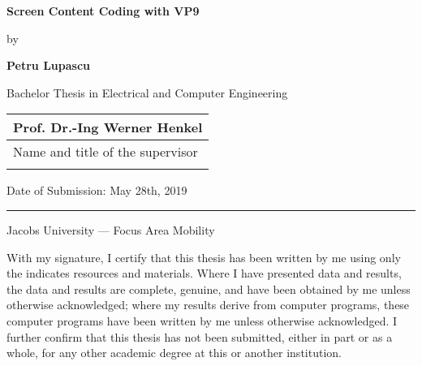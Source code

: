 \documentclass[a4paper,11pt,oneside]{article}
\newcommand{\myname}{Petru Lupascu}
\newcommand{\mytitle}{Screen Content Coding with VP9}
\newcommand{\mysupervisor}{Prof. Dr.-Ing Werner Henkel}
\begin{document}

  \thispagestyle{empty}

  \begin{flushright}
  \end{flushright}
  \vspace{20mm}
  \begin{center}
    \huge
    \textbf{\mytitle}
  \end{center}
  \vspace*{4mm}
  \begin{center}
   \Large by
  \end{center}
  \vspace*{4mm}
  \begin{center}
    \Large
    \textbf{\myname}
  \end{center}
  \vspace*{20mm}
  \begin{center}
    \large
    Bachelor Thesis in Electrical and Computer Engineering
  \end{center}
  \vfill
  \begin{flushright}
    \large
    \begin{tabular}{l}
      \mysupervisor \\
      \hline
      Name and title of the supervisor \\
      \\
    \end{tabular}
  \end{flushright}
  \vspace*{8mm}
  \begin{flushleft}
    \large
    Date of Submission: May 28th, 2019 \\
    \rule{\textwidth}{1pt}
  \end{flushleft}
  \begin{center}
    \Large Jacobs University --- Focus Area Mobility
  \end{center}
  
  \iffalse

  \newpage
  \thispagestyle{empty}

  With my signature, I certify that this thesis has been written by me
  using only the indicates resources and materials. Where I have
  presented data and results, the data and results are complete,
  genuine, and have been obtained by me unless otherwise acknowledged;
  where my results derive from computer programs, these computer
  programs have been written by me unless otherwise acknowledged. I
  further confirm that this thesis has not been submitted, either in
  part or as a whole, for any other academic degree at this or another
  institution.
\end{document}
